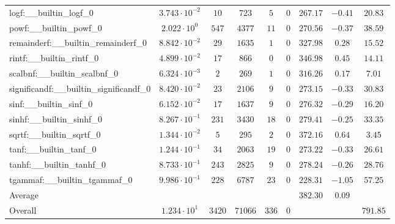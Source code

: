\begin{tabular}{|l|c|c|c|c|c|c|c|c|}
logf:\_\_builtin\_logf\_0                 & $ 3.743 \cdot 10^{-2} $ & $ 10     $ & $ 723   $ & $ 5   $ & $ 0   $ & $ 267.17      $ & $ -0.41   $ & $ 20.83   $ \\
powf:\_\_builtin\_powf\_0                 & $ 2.022 \cdot 10^{0}  $ & $ 547    $ & $ 4377  $ & $ 11  $ & $ 0   $ & $ 270.56      $ & $ -0.37   $ & $ 38.59   $ \\
remainderf:\_\_builtin\_remainderf\_0     & $ 8.842 \cdot 10^{-2} $ & $ 29     $ & $ 1635  $ & $ 1   $ & $ 0   $ & $ 327.98      $ & $ 0.28    $ & $ 15.52   $ \\
rintf:\_\_builtin\_rintf\_0               & $ 4.899 \cdot 10^{-2} $ & $ 17     $ & $ 866   $ & $ 0   $ & $ 0   $ & $ 346.98      $ & $ 0.45    $ & $ 14.11   $ \\
scalbnf:\_\_builtin\_scalbnf\_0           & $ 6.324 \cdot 10^{-3} $ & $ 2      $ & $ 269   $ & $ 1   $ & $ 0   $ & $ 316.26      $ & $ 0.17    $ & $ 7.01    $ \\
significandf:\_\_builtin\_significandf\_0 & $ 8.420 \cdot 10^{-2} $ & $ 23     $ & $ 2106  $ & $ 9   $ & $ 0   $ & $ 273.15      $ & $ -0.33   $ & $ 30.83   $ \\
sinf:\_\_builtin\_sinf\_0                 & $ 6.152 \cdot 10^{-2} $ & $ 17     $ & $ 1637  $ & $ 9   $ & $ 0   $ & $ 276.32      $ & $ -0.29   $ & $ 16.20   $ \\
sinhf:\_\_builtin\_sinhf\_0               & $ 8.267 \cdot 10^{-1} $ & $ 231    $ & $ 3430  $ & $ 18  $ & $ 0   $ & $ 279.41      $ & $ -0.25   $ & $ 33.35   $ \\
sqrtf:\_\_builtin\_sqrtf\_0               & $ 1.344 \cdot 10^{-2} $ & $ 5      $ & $ 295   $ & $ 2   $ & $ 0   $ & $ 372.16      $ & $ 0.64    $ & $ 3.45    $ \\
tanf:\_\_builtin\_tanf\_0                 & $ 1.244 \cdot 10^{-1} $ & $ 34     $ & $ 2063  $ & $ 19  $ & $ 0   $ & $ 273.22      $ & $ -0.33   $ & $ 26.61   $ \\
tanhf:\_\_builtin\_tanhf\_0               & $ 8.733 \cdot 10^{-1} $ & $ 243    $ & $ 2825  $ & $ 9   $ & $ 0   $ & $ 278.24      $ & $ -0.26   $ & $ 28.76   $ \\
tgammaf:\_\_builtin\_tgammaf\_0           & $ 9.986 \cdot 10^{-1} $ & $ 228    $ & $ 6787  $ & $ 23  $ & $ 0   $ & $ 228.31      $ & $ -1.05   $ & $ 57.25   $ \\
\hline
Average                                   & $                     $ & $        $ & $       $ & $     $ & $     $ & $ 382.30      $ & $ 0.09    $ & $         $ \\
\hline
Overall                                   & $ 1.234 \cdot 10^{1}  $ & $ 3420   $ & $ 71066 $ & $ 336 $ & $ 0   $ & $             $ & $         $ & $ 791.85  $ \\
\hline
\end{tabular}
